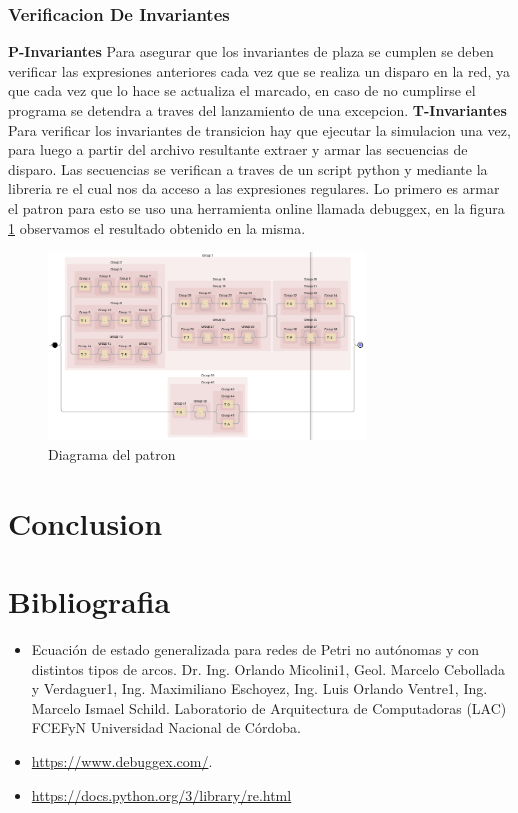 \documentclass{article}
\begin{document}
		\subsubsection{Verificacion De Invariantes}
		\textbf{P-Invariantes} \newline
		Para asegurar que los invariantes de plaza se cumplen se deben verificar las 
		expresiones anteriores cada vez que se realiza un disparo en la red, ya que 
		cada vez que lo hace se actualiza el marcado, en caso de no cumplirse el programa
		se detendra a traves del lanzamiento de una excepcion.\newline
		\textbf{T-Invariantes} \newline
		Para verificar los invariantes de transicion hay que ejecutar la simulacion una vez, 
		para luego a partir del archivo resultante extraer y armar las secuencias de disparo.
		Las secuencias se verifican a traves de un script python y mediante la libreria re el cual nos da acceso a las expresiones regulares. Lo primero es armar el patron para esto se uso una herramienta online llamada debuggex, en la figura \ref{fig:mesh4} observamos el resultado obtenido en la misma.		 
		\begin{figure}[H]
			\centering
			\includegraphics[width=0.75\textwidth]{debuggex}
			\caption{Diagrama del patron}
			\label{fig:mesh4}
		\end{figure}

\section{Conclusion}
	
\section{Bibliografia}
	\begin{itemize}
		\item Ecuación de estado generalizada para redes de Petri no autónomas y con distintos tipos de arcos. Dr. Ing. Orlando Micolini1, Geol. Marcelo Cebollada y Verdaguer1, Ing. Maximiliano Eschoyez, Ing. Luis Orlando Ventre1, Ing. Marcelo Ismael Schild. Laboratorio de Arquitectura de Computadoras (LAC) FCEFyN Universidad Nacional de Córdoba.
		\item \url{https://www.debuggex.com/}.
		\item \href {https://docs.python.org/3/library/re.html}{https://docs.python.org/3/library/re.html}
	\end{itemize}
\end{document}
